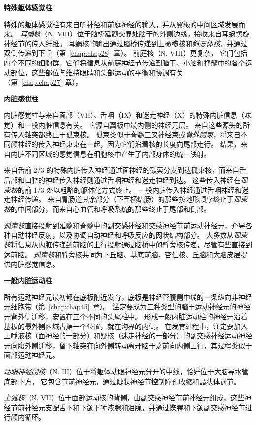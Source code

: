 \textbf{特殊躯体感觉柱}

特殊的躯体感觉柱有来自听神经和前庭神经的输入，并从翼板的中间区域发展而来。
\textit{耳蜗核}（N. VIII）位于脑桥延髓交界处脑干的外侧边缘，接收来自耳蜗螺旋神经节的传入纤维。
耳蜗核的输出通过脑桥传递到上橄榄核和\textit{斜方体核}，并通过双侧传递到下丘（第~\ref{chap:chap28}~章）。
前庭核（N. VIII）更复杂，
它们包括四个不同的细胞群，它们将信息从前庭神经节传递到脑干、小脑和脊髓中的各个运动部位，这些部位与维持眼睛和头部运动的平衡和协调有关（第~\ref{chap:chap27}~章）。


\textbf{内脏感觉柱}

内脏感觉柱与来自面部（VII）、舌咽（IX）和迷走神经（X）的特殊内脏信息（味觉）和一般内脏信息有关。
它源自翼板中最内侧的神经元层。
来自这些源头的所有传入轴突都终止于孤束核。
孤束类似于脊髓三叉神经束或\textit{背外侧束}，将来自不同颅神经的传入神经束束在一起，因为它们沿着核的长度向尾部走行。
结果，来自内脏不同区域的感觉信息在细胞核中产生了内部身体的统一映射。


来自舌前 2/3 的特殊内脏传入神经通过面神经的鼓索分支到达孤束核，而来自舌后部和口腔的神经传入神经则通过舌咽神经和迷走神经到达。
这些传入神经在\textit{孤束核}的前 1/3 处以粗略的躯体化方式终止。
一般内脏传入神经通过舌咽神经和迷走神经传递。
来自胃肠道其余部分（下至横结肠）的那些按地形顺序终止于\textit{孤束核}的中间部分，而来自心血管和呼吸系统的那些终止于尾部和侧部。


\textit{孤束核}直接投射到延髓和脊髓中的副交感神经和交感神经节前运动神经元，介导各种自动神经反射，以及协调自动神经和呼吸反应的网状结构部分。
大多数从\textit{孤束核}将信息从内脏传递到前脑的上行投射通过脑桥中的臂旁核传递，尽管有些直接到达前脑。
\textit{孤束核}和臂旁核共同为下丘脑、基底前脑、杏仁核、丘脑和大脑皮层提供内脏感觉信息。


\textbf{一般内脏运动柱}

所有运动神经元最初都在底板附近发育，底板是神经管腹侧中线的一条纵向非神经元细胞带（第~\ref{chap:chap45}~章）。
注定要成为三种类型的脑干运动神经元的神经元背外侧迁移，安置在三个不同的头尾柱中。
形成一般内脏运动柱的神经元沿着基板的最外侧区域占据一个位置，就在沟界的内侧。
在发育过程中，注定要加入上唾液核（面神经的一部分）和疑核（迷走神经的一部分）的副交感神经运动神经元向腹外侧迁移，留下轴突在向外侧转动离开脑干之前向内侧上行，其过程类似于面部运动神经元。


\textit{动眼神经副核}（N. III）位于将躯体动眼神经元分开的中线，恰好位于大脑导水管底部下方。
它包含节前神经元，通过睫状神经节控制瞳孔收缩和晶状体调节。


\textit{上涎核}（N. VII）位于面部运动核的背侧，由副交感神经节前神经元组成，这些神经节前神经元支配舌下和下颌下唾液腺和泪腺，并通过蝶腭和下颌副交感神经节进行颅内循环。


